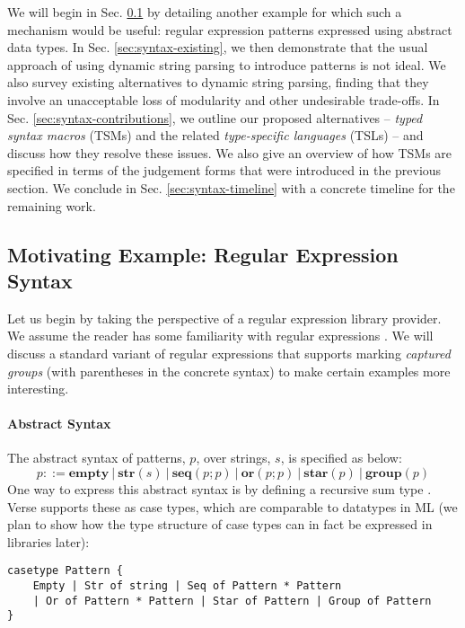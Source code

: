 We will begin in Sec. \ref{sec:examples} by detailing another example for which such a mechanism would be useful: regular expression patterns expressed using abstract data types. In Sec. \ref{sec:syntax-existing}, we then demonstrate that the usual approach of using dynamic string parsing to introduce patterns is not ideal. We also survey existing alternatives to dynamic string parsing, finding that they involve an unacceptable loss of modularity and other undesirable trade-offs. In Sec. \ref{sec:syntax-contributions}, we outline our proposed alternatives -- \emph{typed syntax macros} (TSMs) and the related \emph{type-specific languages} (TSLs) -- and discuss how they resolve these issues. We also give an overview of how TSMs are specified in terms of the judgement forms that were introduced in the previous section. We conclude in Sec. \ref{sec:syntax-timeline} with a concrete timeline for the remaining work.



\subsection{Motivating Example: Regular Expression Syntax}\label{sec:examples}
Let us begin by taking the perspective of a regular expression library provider. We assume the reader has some familiarity with regular expressions \cite{Thompson:1968:PTR:363347.363387}. We will discuss a standard variant of regular expressions that supports marking \emph{captured groups} (with parentheses in the concrete syntax) to make certain examples more interesting.

\paragraph{Abstract Syntax} The abstract syntax of {patterns}, $p$, over strings, $s$, is specified as below:\[p ::= \textbf{empty} ~|~ \textbf{str}(s) ~|~ \textbf{seq}(p; p) ~|~ \textbf{or}(p; p) ~|~ \textbf{star}(p) ~|~ \textbf{group}(p)\]
One way to express this abstract syntax is by defining a recursive sum type \cite{pfpl}. Verse supports these as case types, which are comparable to datatypes in ML (we plan to show how the type structure  of case types can in fact be expressed in libraries later):

\begin{lstlisting}[numbers=none]
casetype Pattern {
    Empty | Str of string | Seq of Pattern * Pattern 
    | Or of Pattern * Pattern | Star of Pattern | Group of Pattern
}
\end{lstlisting}

